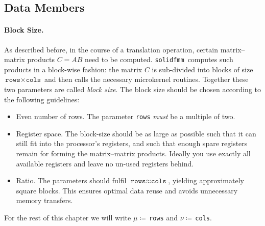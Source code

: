 \documentclass{scrbook}
\newcommand{\solidfmm}{\texttt{solidfmm}}
\begin{document}
\subsection{Data Members}
\paragraph{Block Size.}
As described before, in the course of a translation operation, certain
matrix--matrix products $C=AB$ need to be computed. \solidfmm\ computes such
products in a block-wise fashion: the matrix $C$ is sub-divided into blocks of
size  $\texttt{rows}\times\texttt{cols}$ and then calls the necessary
microkernel routines. Together these two parameters are called \emph{block
size}. The block size should be chosen according to the following guidelines:
\begin{itemize}
\item Even number of rows. The parameter \lstinline|rows| \emph{must} be a
multiple of two. 
\item Register space. The block-size should be as large as possible
such that it can still fit into the processor's registers, and such
that enough spare registers remain for forming the matrix--matrix
products. Ideally you use exactly all available registers and leave
no un-used registers behind.
\item Ratio. The parameters should fulfil $\texttt{rows}\approx\texttt{cols}$,
yielding approximately square blocks. This ensures optimal data reuse and
avoids unnecessary memory transfers.
\end{itemize}

For the rest of this chapter we will write $\mu\coloneqq$\,\lstinline|rows| and
$\nu\coloneqq$\,\lstinline|cols|.
\end{document}

